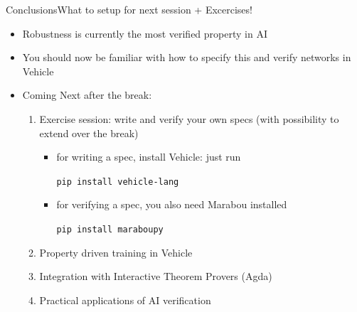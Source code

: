 \documentclass[t,compress,aspectratio=169]{beamer}
\begin{document}
\begin{frame}{Conclusions}{What to setup for next session + Excercises!}
	\begin{itemize}
		\item Robustness is currently the most verified property in AI
        \item You should now be familiar with how to specify this and verify networks in Vehicle
        \item Coming Next after the break:
        \begin{enumerate}
            \item \textcolor{aisecred}{Exercise session:} write and verify your own specs (with possibility to extend over the break)

            \begin{itemize}
            \item for writing a spec, install Vehicle: just run

            \texttt{pip install vehicle-lang}

            \item for verifying a spec, you also need Marabou installed

            \texttt{pip install maraboupy}
            \end{itemize}
            \item Property driven training in Vehicle
            \item Integration with Interactive Theorem Provers (Agda)
            \item Practical applications of AI verification
        \end{enumerate}

	\end{itemize}

\vspace{1em}

\end{frame}
\end{document}
